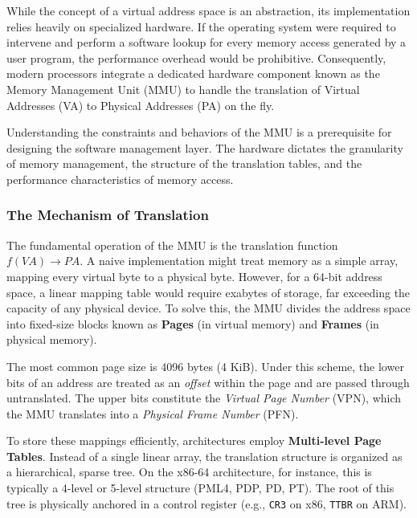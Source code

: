 \documentclass[a4paper,10pt,twoside]{report}
\theoremstyle{definition}
\begin{document}
While the concept of a virtual address space is an abstraction, its implementation relies heavily on specialized hardware. If the operating system were required to intervene and perform a software lookup for every memory access generated by a user program, the performance overhead would be prohibitive. Consequently, modern processors integrate a dedicated hardware component known as the Memory Management Unit (MMU) to handle the translation of Virtual Addresses (VA) to Physical Addresses (PA) on the fly.

Understanding the constraints and behaviors of the MMU is a prerequisite for designing the software management layer. The hardware dictates the granularity of memory management, the structure of the translation tables, and the performance characteristics of memory access.

\subsubsection{The Mechanism of Translation}

The fundamental operation of the MMU is the translation function $f(VA) \rightarrow PA$. A naive implementation might treat memory as a simple array, mapping every virtual byte to a physical byte. However, for a 64-bit address space, a linear mapping table would require exabytes of storage, far exceeding the capacity of any physical device. To solve this, the MMU divides the address space into fixed-size blocks known as \textbf{Pages} (in virtual memory) and \textbf{Frames} (in physical memory).

The most common page size is 4096 bytes (4 KiB). Under this scheme, the lower bits of an address are treated as an \textit{offset} within the page and are passed through untranslated. The upper bits constitute the \textit{Virtual Page Number} (VPN), which the MMU translates into a \textit{Physical Frame Number} (PFN).

To store these mappings efficiently, architectures employ \textbf{Multi-level Page Tables}. Instead of a single linear array, the translation structure is organized as a hierarchical, sparse tree. On the x86-64 architecture, for instance, this is typically a 4-level or 5-level structure (PML4, PDP, PD, PT). The root of this tree is physically anchored in a control register (e.g., \texttt{CR3} on x86, \texttt{TTBR} on ARM).
\end{document}
